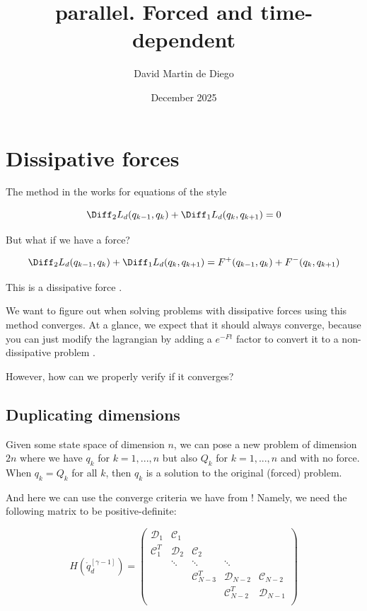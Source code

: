 \documentclass{article}
\title{parallel. Forced and time-dependent}
\author{David Martin de Diego}
\date{December 2025}
\begin{document}
\maketitle

\section{Dissipative forces}

The method in the \cite{ferraroParallelIterativeMethod2025} works for equations of the style 

\[ \Diff_2 L_d (q_{k-1}, q_k) + \Diff_1 L_d (q_k, q_{k+1}) = 0 \]

But what if we have a force?

\[ \Diff_2 L_d (q_{k-1}, q_k) + \Diff_1 L_d (q_k, q_{k+1}) = F^+(q_{k-1}, q_k) + F^-(q_k, q_{k+1}) \]

This is a dissipative force . 

We want to figure out when solving problems with dissipative forces using this method  converges. At a glance, we expect that it should always converge, because you can just modify the lagrangian by adding a $e^{-Ft}$ factor to convert it to a non-dissipative problem . 

However, how can we properly verify if it converges?

\subsection{Duplicating dimensions}

Given some state space of dimension $n$, we can pose a new problem of dimension $2n$ where we have $q_k$ for $k = 1,...,n$ but also $Q_k$ for $k = 1,...,n$ and with no force. When $q_k = Q_k$ for all $k$, then $q_k$ is a solution to the original (forced) problem.

And here we can use the converge criteria we have from \cite{ferraroParallelIterativeMethod2025}! Namely, we need the following matrix to be positive-definite:

\[
    H(\mathring{q}_d^{[\gamma-1]}) = \begin{pmatrix}
        \mathcal{D}_1 & \mathcal{C}_1 \\
        \mathcal{C}_1^T & \mathcal{D}_2 & \mathcal{C}_2 \\
        & \ddots & \ddots & \ddots & \\
        & & \mathcal{C}_{N-3}^T & \mathcal{D}_{N-2} & \mathcal{C}_{N-2} \\ 
        & & & \mathcal{C}_{N-2}^T & \mathcal{D}_{N-1} \\ 
        
    \end{pmatrix}
\]
\end{document}
